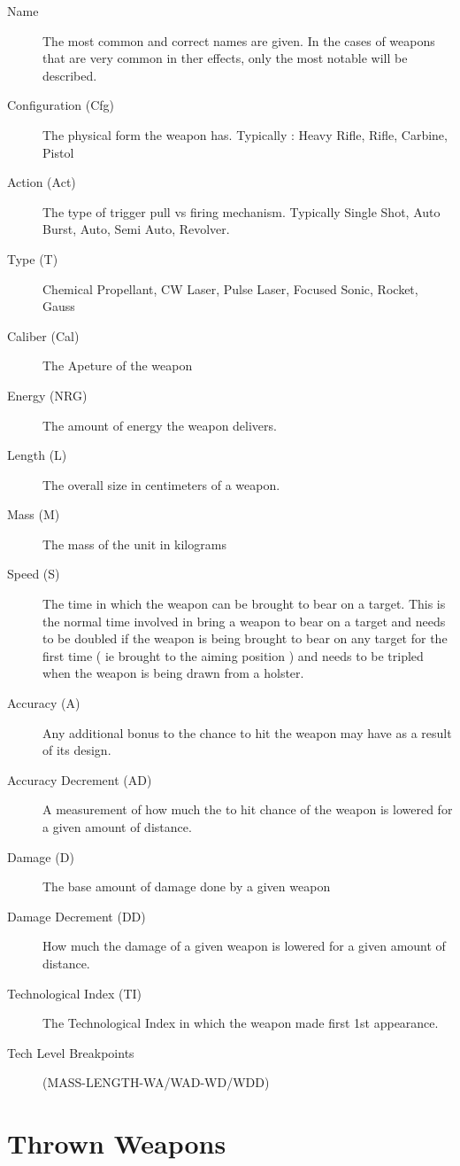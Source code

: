 \begin{description}
	\item[Name] 
	The most common and correct names are given. In the cases of weapons that are very common in ther effects, only the most notable will be described.
	\item[Configuration (Cfg)] 
	The physical form the weapon has. Typically : Heavy Rifle, Rifle, Carbine, Pistol 
	\item[Action (Act)] 	
	The type of trigger pull vs firing mechanism. Typically Single Shot, Auto Burst,	Auto, Semi Auto, Revolver.
	\item[Type (T)]	
Chemical Propellant, CW Laser, Pulse Laser, Focused Sonic, Rocket, Gauss
	\item[Caliber (Cal)]
 	The Apeture of the weapon
	\item[Energy (NRG)]	
The amount of energy the weapon delivers.
	\item[Length (L)]	
The overall size in centimeters of a weapon.
	\item[Mass (M)]
	The mass of the unit in kilograms
	\item[Speed (S)]
 The time in which the weapon can be brought to bear on a target. This is the normal time involved in bring a weapon to bear on a target and needs	to be doubled if the weapon is being brought to bear on any target for the first time ( ie brought to the aiming position ) and needs to be tripled when the weapon is being drawn from a holster.
	\item[Accuracy (A)]
 Any additional bonus to the chance to hit the weapon may have as a result of its design.
	\item[Accuracy Decrement (AD)]
	A measurement of how much the to hit chance of the weapon is lowered for a given amount of distance.
	\item[Damage (D)]
 The base amount of dam\-age done by a given weapon
	\item[Damage Decrement  (DD)]
 How much the damage of a given weapon is lowered for a given amount of distance.
	\item[Technological Index (TI)]
	The Technological Index in which the weapon made first 1st appearance.
	\item[Tech Level Breakpoints]	
(MASS-LENGTH-WA/WAD-WD/WDD)
\end{description}

\clearpage
\section{Thrown Weapons}

